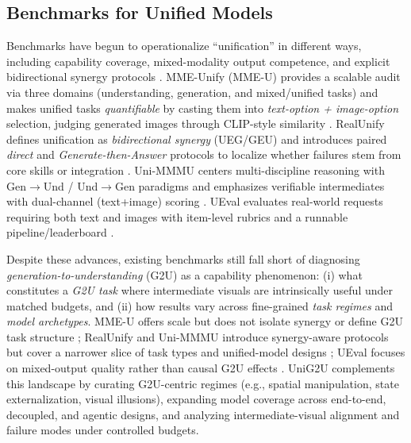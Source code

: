 \documentclass{article}
\theoremstyle{plain}
\theoremstyle{definition}
\theoremstyle{remark}
\begin{document}
\subsection{Benchmarks for Unified Models}
Benchmarks have begun to operationalize ``unification'' in different ways, including capability coverage, mixed-modality output competence, and explicit bidirectional synergy protocols \citep{xie2025mmeunify,shi2025realunify,zou2025unimmmu,li2026ueval}.
MME-Unify (MME-U) provides a scalable audit via three domains (understanding, generation, and mixed/unified tasks) and makes unified tasks \emph{quantifiable} by casting them into \emph{text-option + image-option} selection, judging generated images through CLIP-style similarity \citep{xie2025mmeunify,radford2021clip}.
RealUnify defines unification as \emph{bidirectional synergy} (UEG/GEU) and introduces paired \emph{direct} and \emph{Generate-then-Answer } protocols to localize whether failures stem from core skills or integration \citep{shi2025realunify}.
Uni-MMMU centers multi-discipline reasoning with Gen$\rightarrow$Und / Und$\rightarrow$Gen paradigms and emphasizes verifiable intermediates with dual-channel (text+image) scoring \citep{zou2025unimmmu,yue2023mmmu}.
UEval evaluates real-world requests requiring both text and images with item-level rubrics and a runnable pipeline/leaderboard \citep{li2026ueval,li2025unieval}.

Despite these advances, existing benchmarks still fall short of diagnosing \emph{generation-to-understanding} (G2U) as a capability phenomenon: (i) what constitutes a \emph{G2U task} where intermediate visuals are intrinsically useful under matched budgets, and (ii) how results vary across fine-grained \emph{task regimes} and \emph{model archetypes}.
MME-U offers scale but does not isolate synergy or define G2U task structure \citep{xie2025mmeunify}; RealUnify and Uni-MMMU introduce synergy-aware protocols but cover a narrower slice of task types and unified-model designs \citep{shi2025realunify,zou2025unimmmu}; UEval focuses on mixed-output quality rather than causal G2U effects \citep{li2026ueval}.
UniG2U complements this landscape by curating G2U-centric regimes (e.g., spatial manipulation, state externalization, visual illusions), expanding model coverage across end-to-end, decoupled, and agentic designs, and analyzing intermediate-visual alignment and failure modes under controlled budgets.


\end{document}
